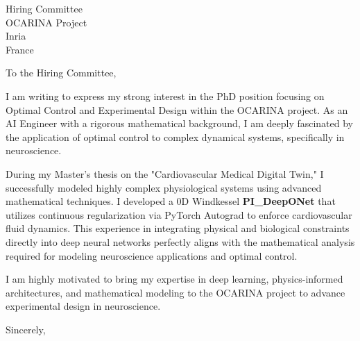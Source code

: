 \documentclass[11pt,a4paper]{letter}
\begin{document}
\begin{letter}{
    Hiring Committee \\
    OCARINA Project \\
    Inria \\
    France
}
\opening{To the Hiring Committee,}

I am writing to express my strong interest in the PhD position focusing on Optimal Control and Experimental Design within the OCARINA project. As an AI Engineer with a rigorous mathematical background, I am deeply fascinated by the application of optimal control to complex dynamical systems, specifically in neuroscience.

During my Master's thesis on the "Cardiovascular Medical Digital Twin," I successfully modeled highly complex physiological systems using advanced mathematical techniques. I developed a 0D Windkessel \textbf{PI\_DeepONet} that utilizes continuous regularization via PyTorch Autograd to enforce cardiovascular fluid dynamics. This experience in integrating physical and biological constraints directly into deep neural networks perfectly aligns with the mathematical analysis required for modeling neuroscience applications and optimal control. 

I am highly motivated to bring my expertise in deep learning, physics-informed architectures, and mathematical modeling to the OCARINA project to advance experimental design in neuroscience.

\closing{Sincerely,}
\end{letter}
\end{document}
